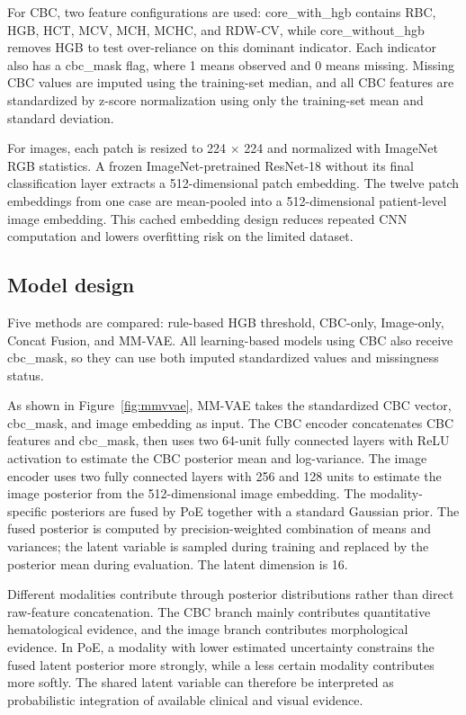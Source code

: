 \documentclass[conference,letterpaper]{IEEEtran}
\begin{document}
For CBC, two feature configurations are used: core\_with\_hgb contains RBC, HGB, HCT, MCV, MCH, MCHC, and RDW-CV, while core\_without\_hgb removes HGB to test over-reliance on this dominant indicator. Each indicator also has a cbc\_mask flag, where 1 means observed and 0 means missing. Missing CBC values are imputed using the training-set median, and all CBC features are standardized by z-score normalization using only the training-set mean and standard deviation.

For images, each patch is resized to 224 $\times$ 224 and normalized with ImageNet RGB statistics. A frozen ImageNet-pretrained ResNet-18 without its final classification layer extracts a 512-dimensional patch embedding. The twelve patch embeddings from one case are mean-pooled into a 512-dimensional patient-level image embedding. This cached embedding design reduces repeated CNN computation and lowers overfitting risk on the limited dataset.

\subsection{Model design}

Five methods are compared: rule-based HGB threshold, CBC-only, Image-only, Concat Fusion, and MM-VAE. All learning-based models using CBC also receive cbc\_mask, so they can use both imputed standardized values and missingness status.

As shown in Figure~\ref{fig:mmvvae}, MM-VAE takes the standardized CBC vector, cbc\_mask, and image embedding as input. The CBC encoder concatenates CBC features and cbc\_mask, then uses two 64-unit fully connected layers with ReLU activation to estimate the CBC posterior mean and log-variance. The image encoder uses two fully connected layers with 256 and 128 units to estimate the image posterior from the 512-dimensional image embedding. The modality-specific posteriors are fused by PoE together with a standard Gaussian prior. The fused posterior is computed by precision-weighted combination of means and variances; the latent variable is sampled during training and replaced by the posterior mean during evaluation. The latent dimension is 16.

Different modalities contribute through posterior distributions rather than direct raw-feature concatenation. The CBC branch mainly contributes quantitative hematological evidence, and the image branch contributes morphological evidence. In PoE, a modality with lower estimated uncertainty constrains the fused latent posterior more strongly, while a less certain modality contributes more softly. The shared latent variable can therefore be interpreted as probabilistic integration of available clinical and visual evidence.
\end{document}

